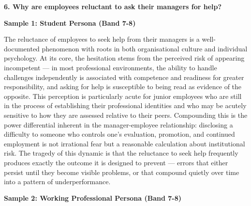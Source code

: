 \separator

\begin{ieltsquestion}
\textbf{6. Why are employees reluctant to ask their managers for help?}
\end{ieltsquestion}
\textbf{Sample 1: Student Persona (Band 7-8)}

The reluctance of employees to seek help from their managers is a well-documented phenomenon with roots in both organisational culture and individual psychology. At its core, the hesitation stems from the perceived risk of appearing incompetent — in most professional environments, the ability to handle challenges independently is associated with competence and readiness for greater responsibility, and asking for help is susceptible to being read as evidence of the opposite. This perception is particularly acute for junior employees who are still in the process of establishing their professional identities and who may be acutely sensitive to how they are assessed relative to their peers. Compounding this is the power differential inherent in the manager-employee relationship: disclosing a difficulty to someone who controls one's evaluation, promotion, and continued employment is not irrational fear but a reasonable calculation about institutional risk. The tragedy of this dynamic is that the reluctance to seek help frequently produces exactly the outcome it is designed to prevent — errors that either persist until they become visible problems, or that compound quietly over time into a pattern of underperformance.

\textbf{Sample 2: Working Professional Persona (Band 7-8)}

